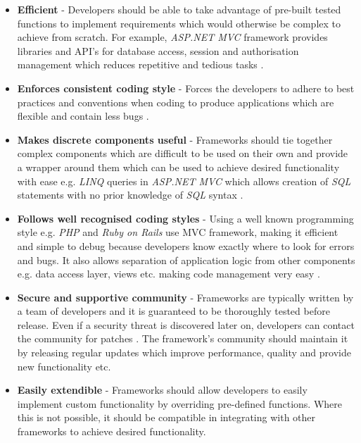\begin{itemize}
    \item \textbf{Efficient} - Developers should be able to take advantage of pre-built tested functions to implement requirements which would otherwise be complex to achieve from scratch. For example, \textit{ASP.NET MVC} framework provides libraries and API’s for database access, session and authorisation management which reduces repetitive and tedious tasks \cite{asp.net-team}.

    \item \textbf{Enforces consistent coding style} - Forces the developers to adhere to best practices and conventions when coding to produce applications which are flexible and contain less bugs \cite{cimetrix}.

    \item \textbf{Makes discrete components useful} - Frameworks should tie together complex components which are difficult to be used on their own and provide a wrapper around them which can be used to achieve desired functionality with ease e.g. \textit{LINQ} queries in \textit{ASP.NET MVC} which allows creation of \textit{SQL} statements with no prior knowledge of \textit{SQL} syntax \cite{social-msdn}.

    \item \textbf{Follows well recognised coding styles} - Using a well known programming style e.g. \textit{PHP} and \textit{Ruby on Rails} use MVC framework, making it efficient and simple to debug because developers know exactly where to look for errors and bugs. It also allows separation of application logic from other components e.g. data access layer, views etc. making code management very easy \cite{speckyboy}.

	  \item \textbf{Secure and supportive community} - Frameworks are typically written by a team of developers and it is guaranteed to be thoroughly tested before release. Even if a security threat is discovered later on, developers can contact the community for patches \cite{OSTraining}. The framework’s community should maintain it by releasing regular updates which improve performance, quality and provide new functionality etc. \cite{cimetrix}

	  \item \textbf{Easily extendible} - Frameworks should allow developers to easily implement custom functionality by overriding pre-defined functions. Where this is not possible, it should be compatible in integrating with other frameworks to achieve desired functionality.
\end{itemize}

